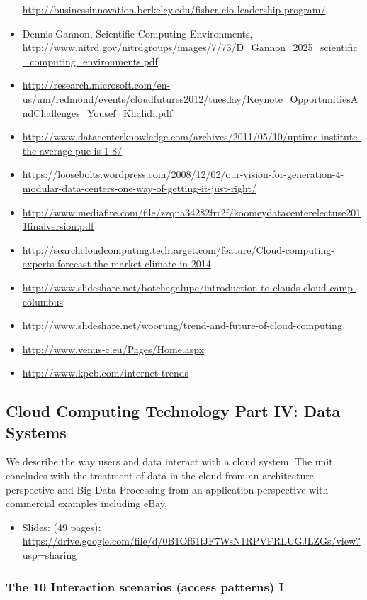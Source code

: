 \begin{itemize}
  \url{http://businessinnovation.berkeley.edu/fisher-cio-leadership-program/}
\item
  Dennis Gannon, Scientific Computing Environments,
  \url{http://www.nitrd.gov/nitrdgroups/images/7/73/D_Gannon_2025_scientific_computing_environments.pdf}
\item
  \url{http://research.microsoft.com/en-us/um/redmond/events/cloudfutures2012/tuesday/Keynote_OpportunitiesAndChallenges_Yousef_Khalidi.pdf}
\item
  \url{http://www.datacenterknowledge.com/archives/2011/05/10/uptime-institute-the-average-pue-is-1-8/}
\item
  \url{https://loosebolts.wordpress.com/2008/12/02/our-vision-for-generation-4-modular-data-centers-one-way-of-getting-it-just-right/}
\item
  \url{http://www.mediafire.com/file/zzqna34282frr2f/koomeydatacenterelectuse2011finalversion.pdf}
\item
  \url{http://searchcloudcomputing.techtarget.com/feature/Cloud-computing-experts-forecast-the-market-climate-in-2014}
\item
  \url{http://www.slideshare.net/botchagalupe/introduction-to-clouds-cloud-camp-columbus}
\item
  \url{http://www.slideshare.net/woorung/trend-and-future-of-cloud-computing}
\item
  \url{http://www.venus-c.eu/Pages/Home.aspx}
\item
  \url{http://www.kpcb.com/internet-trends}
\end{itemize}

\subsection{Cloud Computing Technology Part IV: Data Systems}

We describe the way users and data interact with a cloud system. The
unit concludes with the treatment of data in the cloud from an
architecture perspective and Big Data Processing from an application
perspective with commercial examples including eBay.

\begin{itemize}
\tightlist
\item
  Slides: (49 pages):
  \url{https://drive.google.com/file/d/0B1Of61fJF7WsN1RPVFRLUGJLZGs/view?usp=sharing}
\end{itemize}

\subsubsection{The 10 Interaction scenarios (access patterns)
I}\label{the-10-interaction-scenarios-access-patterns-i}

